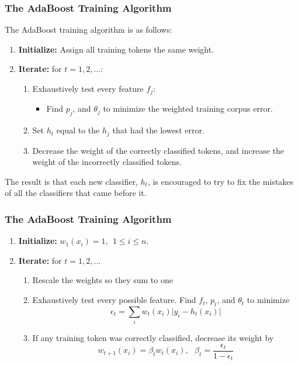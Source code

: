 \documentclass{beamer}
\begin{document}
\begin{frame}
  \frametitle{The AdaBoost Training Algorithm}

  The AdaBoost training algorithm is as follows:
  \begin{enumerate}
  \item {\bf Initialize:} Assign all training tokens the same weight.
  \item {\bf Iterate:} for $t=1,2,\ldots$:
    \begin{enumerate}
    \item Exhaustively test every feature $f_j$:
      \begin{itemize}
      \item Find $p_j$, and $\theta_j$ to minimize the weighted
        training corpus error.
      \end{itemize}
    \item Set $h_t$ equal to the $h_j$ that had the lowest error.
    \item Decrease the weight of the correctly classified tokens, and
      increase the weight of the incorrectly classified tokens.
    \end{enumerate}
  \end{enumerate}
  The result is that each new classifier, $h_t$, is encouraged to try
  to fix the mistakes of all the classifiers that came before it.
\end{frame}

\begin{frame}
  \frametitle{The AdaBoost Training Algorithm}
  \begin{enumerate}
  \item {\bf Initialize:} $w_1(x_i)=1,~~1\le i\le n$.
  \item {\bf Iterate:} for $t=1,2,\ldots$
    \begin{enumerate}
    \item Rescale the weights so they sum to one
    \item Exhaustively test every possible feature.  Find $f_t$,
      $p_t$, and $\theta_t$ to minimize
      \begin{displaymath}
        \epsilon_t = \sum_i w_t(x_i)\vert y_i-h_t(x_i)\vert
      \end{displaymath}
    \item If any training token was correctly classified, decrease its weight by
      \begin{displaymath}
        w_{t+1}(x_i) = \beta_tw_t(x_i),~~~\beta_t =\frac{\epsilon_t}{1-\epsilon_t}
      \end{displaymath}
    \end{enumerate}
  \end{enumerate}
\end{frame}
\end{document}
